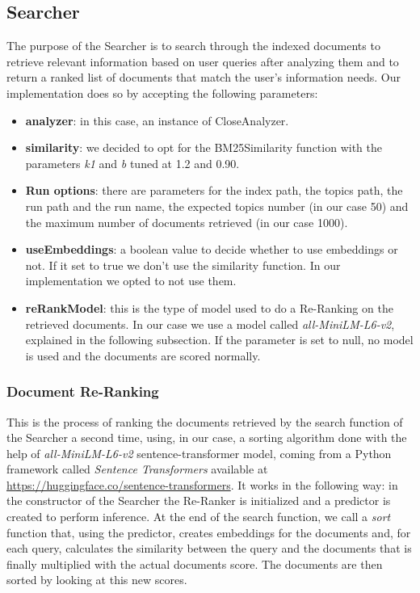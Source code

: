 \subsection{Searcher}
The purpose of the Searcher is to search through the indexed documents to retrieve relevant information based on user queries after analyzing them and to
return a ranked list of documents that match the user’s information needs.
\newline
Our implementation does so by accepting the following parameters:
\begin{itemize}
  \item \textbf{analyzer}: in this case, an instance of CloseAnalyzer.
  \item \textbf{similarity}: we decided to opt for the BM25Similarity function with the parameters \textit{k1} and \textit{b} tuned at 1.2 and 0.90.
  \item \textbf{Run options}: there are parameters for the index path, the topics path, the run path and the run name, the expected topics number (in our case 50) and the maximum number of documents retrieved (in our case 1000).
  \item \textbf{useEmbeddings}: a boolean value to decide whether to use embeddings or not. If it set to true we don't use the similarity function. In our implementation we opted to not use them.
  \item \textbf{reRankModel}: this is the type of model used to do a Re-Ranking on the retrieved documents. In our case we use a model called \textit{all-MiniLM-L6-v2}, explained in the following subsection. If the parameter is set to null, no model is used and the documents are scored normally.
\end{itemize}

\subsubsection{Document Re-Ranking}
This is the process of ranking the documents retrieved by the search function of the Searcher a second time, using, in our case, a sorting algorithm done with the help of \textit{all-MiniLM-L6-v2} sentence-transformer model, coming from a Python framework called \textit{Sentence Transformers} available at \url{https://huggingface.co/sentence-transformers}.
\newline
It works in the following way: in the constructor of the Searcher the Re-Ranker is initialized and a predictor is created to perform inference. At the end of the search function, we call a \textit{sort} function that, using the predictor, creates embeddings for the documents and, for each query, calculates the similarity between the query and the documents that is finally multiplied with the actual documents score. The documents are then sorted by looking at this new scores.


